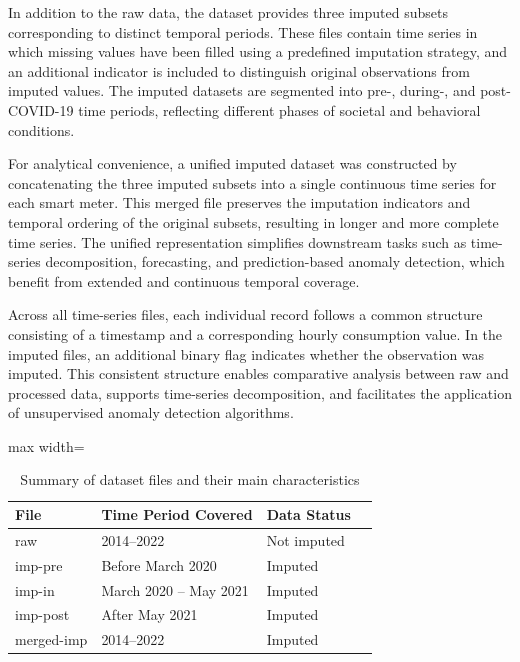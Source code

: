 ﻿\documentclass[12pt,reqno, twoside]{amsbook}
\numberwithin{figure}{chapter}
\numberwithin{table}{chapter}
\numberwithin{equation}{chapter}
\theoremstyle{plain}
\numberwithin{equation}{chapter}
\numberwithin{section}{chapter}
\begin{document}
\noindent
In addition to the raw data, the dataset provides three imputed subsets corresponding to distinct temporal periods. These files contain time series in which missing values have been filled using a predefined imputation strategy, and an additional indicator is included to distinguish original observations from imputed values. The imputed datasets are segmented into pre-, during-, and post-COVID-19 time periods, reflecting different phases of societal and behavioral conditions.

For analytical convenience, a unified imputed dataset was constructed by concatenating the three imputed subsets into a single continuous time series for each smart meter. This merged file preserves the imputation indicators and temporal ordering of the original subsets, resulting in longer and more complete time series. The unified representation simplifies downstream tasks such as time-series decomposition, forecasting, and prediction-based anomaly detection, which benefit from extended and continuous temporal coverage.

Across all time-series files, each individual record follows a common structure consisting of a timestamp and a corresponding hourly consumption value. In the imputed files, an additional binary flag indicates whether the observation was imputed. This consistent structure enables comparative analysis between raw and processed data, supports time-series decomposition, and facilitates the application of unsupervised anomaly detection algorithms.
\noindent

\begin{table}[h]
\centering
\caption{Summary of dataset files and their main characteristics}
\label{tab:dataset_files}
\begin{adjustbox}{max width=\textwidth}
\begin{tabular}{llll}
\hline
\textbf{File} & \textbf{Time Period Covered} & \textbf{Data Status} \\
\hline
raw & 2014--2022 & Not imputed &  \\
imp-pre & Before March 2020 & Imputed \\
imp-in & March 2020 -- May 2021 & Imputed \\
imp-post & After May 2021 & Imputed \\
merged-imp & 2014--2022 & Imputed  \\

\hline
\end{tabular}
\end{adjustbox}
\end{table}
\end{document}
